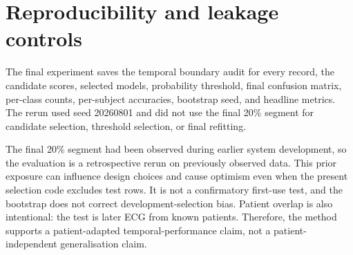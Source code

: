 \section{Reproducibility and leakage controls}

The final experiment saves the temporal boundary audit for every record, the
candidate scores, selected models, probability threshold, final confusion
matrix, per-class counts, per-subject accuracies, bootstrap seed, and headline
metrics. The rerun used seed 20260801 and did not use the final 20\% segment
for candidate selection, threshold selection, or final refitting.

The final 20\% segment had been observed during earlier system development, so
the evaluation is a retrospective rerun on previously observed data.
This prior exposure can influence design choices and cause optimism even
when the present selection code excludes test rows. It is not a confirmatory
first-use test, and the bootstrap does not correct development-selection bias. Patient overlap is
also intentional: the test is later ECG from known patients. Therefore, the
method supports a patient-adapted temporal-performance claim, not a
patient-independent generalisation claim.
